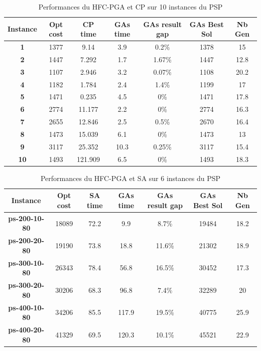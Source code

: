 \documentclass[12pt,a4paper]{article}
\begin{document}
	\begin{table}[h]
		\centering
		\begin{tabular}{|c|c|c|c|c|c|c|}
			\hline
			\textbf{Instance} & \textbf{Opt cost} & \textbf{CP time} & \textbf{GAs time} & \textbf{GAs result gap} & \textbf{GAs Best Sol} & \textbf{Nb Gen}\\
			\hline
			\textbf{1} & 1377 & 9.14 & 3.9 & 0.2\% & 1378 & 15 \\
			\textbf{2} & 1447 & 7.292 & 1.7 & 1.67\% & 1447 & 12.8\\
			\textbf{3} & 1107 & 2.946 & 3.2 & 0.07\% & 1108 & 20.2\\
			\textbf{4} & 1182 & 1.784 & 2.4 & 1.4\% & 1199 & 17\\
			\textbf{5} & 1471 & 0.235 & 4.5 & 0\% & 1471 & 17.8\\
			\textbf{6} & 2774 & 11.177 & 2.2 & 0\% & 2774 & 16.3\\
			\textbf{7} & 2655 & 12.846 & 2.5 & 0.5\% & 2670 & 16.4\\
			\textbf{8} & 1473 & 15.039 & 6.1 & 0\% & 1473 & 13\\
			\textbf{9} & 3117 & 25.352 & 10.3 & 0.25\% & 3117 & 15.4\\
			\textbf{10} & 1493 & 121.909 & 6.5 & 0\% & 1493 & 18.3\\
			\hline
		\end{tabular}	
		\caption{Performances du HFC-PGA et CP sur 10 instances du PSP}	
		\label{tab:hfc_pga_cp}
	\end{table}			
	
	\begin{table}[h]
		\centering
		\begin{tabular}{|c|c|c|c|c|c|c|}
			\hline
			\textbf{Instance} & \textbf{Opt cost} & \textbf{SA time} & \textbf{GAs time} & \textbf{GAs result gap} & \textbf{GAs Best Sol} & \textbf{Nb Gen}\\
			\hline
			\textbf{ps-200-10-80} & 18089 & 72.2 & 9.9 & 8.7\% & 19484 & 18.2 \\
			\textbf{ps-200-20-80} & 19190 & 73.8 & 18.8 & 11.6\% & 21302 & 18.9 \\
			\textbf{ps-300-10-80} & 26343 & 78.4 & 56.8 & 16.5\% & 30452 & 17.3 \\
			\textbf{ps-300-20-80} & 30206 & 68.3 & 96.8 & 7.4\% & 32289 & 20 \\
			\textbf{ps-400-10-80} & 34206 & 85.5 & 117.9 & 19.5\% & 40775 & 25.9 \\
			\textbf{ps-400-20-80} & 41329 & 69.5 & 120.3 & 10.1\% & 45521 & 22.9 \\
			\hline
		\end{tabular}	
		\caption{Performances du HFC-PGA et SA sur 6 instances du PSP}
		\label{tab:hfc_pga_sa}	
	\end{table}			
		
\end{document}
